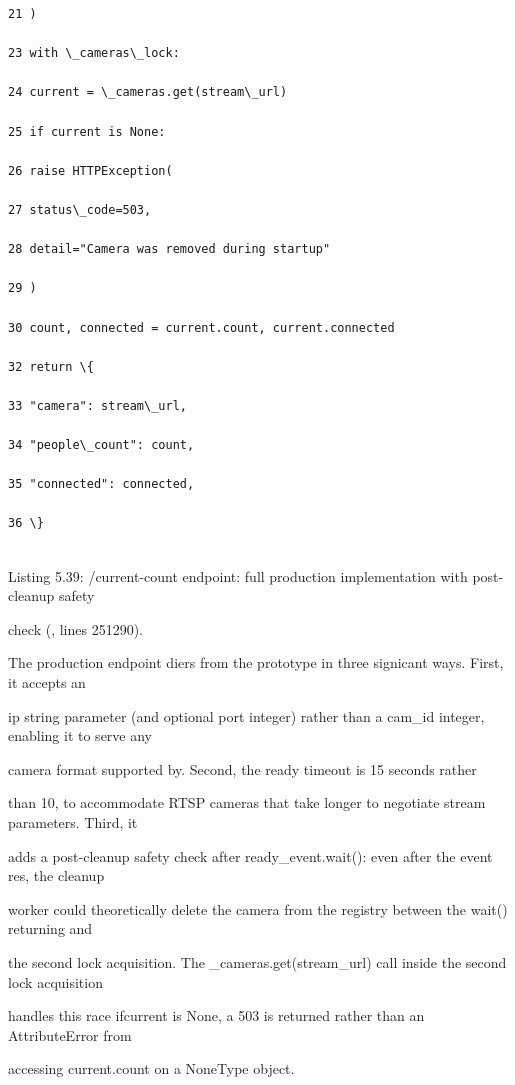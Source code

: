 \begin{listingbox}
	\begin{verbatim}
21 )

23 with \_cameras\_lock:

24 current = \_cameras.get(stream\_url)

25 if current is None:

26 raise HTTPException(

27 status\_code=503,

28 detail="Camera was removed during startup"

29 )

30 count, connected = current.count, current.connected

32 return \{

33 "camera": stream\_url,

34 "people\_count": count,

35 "connected": connected,

36 \}


\end{verbatim}
\end{listingbox}
Listing 5.39: /current-count endpoint: full production implementation with post-cleanup safety

check (, lines 251290).

The production endpoint diers from the prototype in three signicant ways. First, it accepts an

ip string parameter (and optional port integer) rather than a cam\_id integer, enabling it to serve any

camera format supported by. Second, the ready timeout is 15 seconds rather

than 10, to accommodate RTSP cameras that take longer to negotiate stream parameters. Third, it

adds a post-cleanup safety check after ready\_event.wait(): even after the event res, the cleanup

worker could theoretically delete the camera from the registry between the wait() returning and

the second lock acquisition. The \_cameras.get(stream\_url) call inside the second lock acquisition

handles this race  ifcurrent is None, a 503 is returned rather than an AttributeError from

accessing current.count on a NoneType object.

